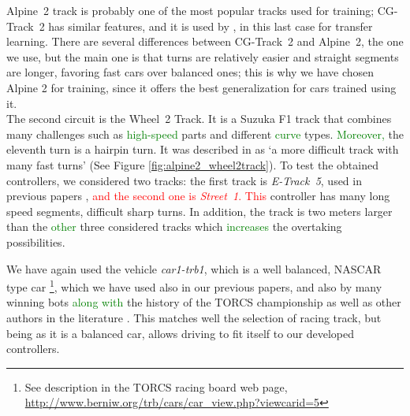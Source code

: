 \documentclass[10pt,journal,compsoc]{IEEEtran}
\begin{document}
\mbox{Alpine 2} track is probably one of the most popular tracks used for
training; \mbox{CG-Track 2} has similar features, and it is used by
\cite{mirus2019short,8833873,verma2018programmatically},
in this last case for transfer learning. There are several differences between \mbox{CG-Track 2} and \mbox{Alpine 2}, the one we use, but the main one is that turns are relatively easier and straight segments are longer, favoring fast cars over balanced ones; this is why we have chosen Alpine 2 for training, since
it offers the best generalization for cars trained using it.\\
The second circuit is the \mbox{Wheel 2} Track. It is a  Suzuka F1 track that combines many challenges such as  \textcolor{green}{high-speed} parts and different  \textcolor{green}{curve} types.  \textcolor{green}{Moreover,} the eleventh turn is a hairpin turn. It was  described in \cite{wheel2track_chen} as `a more difficult track with many fast turns' (See Figure \ref{fig:alpine2_wheel2track}).
To test the obtained controllers, we considered two tracks: the first track is \mbox{\textit{E-Track 5}}, used in previous papers \cite{salem_evo17},\cite{salem_evo18} \textcolor{red}{and the second one is \mbox{\textit{Street 1}}.
This }controller has many long speed segments, difficult sharp turns. In addition, the track is two meters larger than the  \textcolor{green}{other}  three considered tracks which  \textcolor{green}{increases} the overtaking possibilities.

We have again used the vehicle \mbox{\textit{car1-trb1}},
which is a well balanced, NASCAR type car \footnote{See description in
  the TORCS racing board web page,
  \url{http://www.berniw.org/trb/cars/car_view.php?viewcarid=5}},
which we have used also in our previous papers, and also by many
winning bots  \textcolor{green}{along with} the history of the TORCS championship
\cite{torcs5} as well as other authors in the literature
\cite{auteur2010}. This matches well the selection
of racing track, but being as it is a balanced car, allows driving to
fit itself to our developed controllers.
\end{document}
